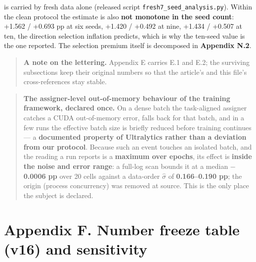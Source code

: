 \documentclass[pdflatex,sn-mathphys-ay]{sn-jnl}
\begin{document}
is carried by fresh data alone (released script \texttt{fresh7\_seed\_analysis.py}). Within the clean protocol the estimate is also \textbf{not monotone in the seed count}: +1.562 / +0.693 pp at six seeds, +1.420 / +0.492 at nine, +1.434 / +0.507 at ten, the direction selection inflation predicts, which is why the ten-seed value is the one reported. The selection premium itself is decomposed in \textbf{Appendix N.2}.

\begin{quote}
\textbf{A note on the lettering.} Appendix E carries E.1 and E.2; the surviving subsections keep their original numbers so that the article's and this file's cross-references stay stable.
\end{quote}

\begin{quote}
\textbf{The assigner-level out-of-memory behaviour of the training framework, declared once.} On a dense batch the task-aligned assigner catches a CUDA out-of-memory error, falls back for that batch, and in a few runs the effective batch size is briefly reduced before training continues --- a \textbf{documented property of Ultralytics rather than a deviation from our protocol}. Because such an event touches an isolated batch, and the reading a run reports is a \textbf{maximum over epochs}, its effect is \textbf{inside the noise and error range}: a full-log scan bounds it at a median \textbf{\ensuremath{-}0.0006 pp} over 20 cells against a data-order $\hat{\sigma}$ of \textbf{0.166--0.190 pp}; the origin (process concurrency) was removed at source. This is the only place the subject is declared.
\end{quote}

\section*{Appendix F. Number freeze table (v16) and sensitivity}
\end{document}
